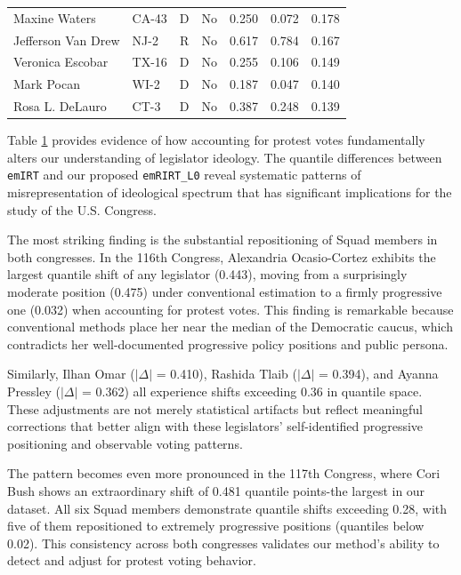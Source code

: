 \documentclass[11pt]{article}
\begin{document}
\begin{table}[!htb]
\begin{tabular}{llccrrr}
Maxine Waters           & CA-43 & D & No   & 0.250 & 0.072 & 0.178 \\
Jefferson Van Drew      & NJ-2  & R & No   & 0.617 & 0.784 & 0.167 \\
Veronica Escobar        & TX-16 & D & No   & 0.255 & 0.106 & 0.149 \\
Mark Pocan              & WI-2  & D & No   & 0.187 & 0.047 & 0.140 \\
Rosa L. DeLauro         & CT-3  & D & No   & 0.387 & 0.248 & 0.139 \\
\bottomrule
\end{tabular}\label{tab:legislatordata}
\end{table}


Table \ref{tab:legislatordata} provides evidence of how accounting for protest votes fundamentally alters our understanding of legislator ideology. The quantile differences between \texttt{emIRT} and our proposed \texttt{emRIRT\_L0} reveal systematic patterns of misrepresentation of ideological spectrum that has significant implications for the study of the U.S. Congress. 

The most striking finding is the substantial repositioning of Squad members in both congresses. In the 116th Congress, Alexandria Ocasio-Cortez exhibits the largest quantile shift of any legislator (0.443), moving from a surprisingly moderate position (0.475) under conventional estimation to a firmly progressive one (0.032) when accounting for protest votes. This finding is remarkable because conventional methods place her near the median of the Democratic caucus, which contradicts her well-documented progressive policy positions and public persona.

Similarly, Ilhan Omar ($|\Delta|$ = 0.410), Rashida Tlaib ($|\Delta|$ = 0.394), and Ayanna Pressley ($|\Delta|$ = 0.362) all experience shifts exceeding 0.36 in quantile space. These adjustments are not merely statistical artifacts but reflect meaningful corrections that better align with these legislators' self-identified progressive positioning and observable voting patterns.

The pattern becomes even more pronounced in the 117th Congress, where Cori Bush shows an extraordinary shift of 0.481 quantile points-the largest in our dataset. All six Squad members demonstrate quantile shifts exceeding 0.28, with five of them repositioned to extremely progressive positions (quantiles below 0.02). This consistency across both congresses validates our method's ability to detect and adjust for protest voting behavior.
\end{document}
